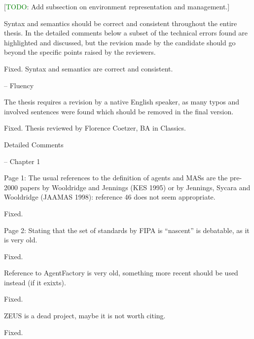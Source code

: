 \documentclass{article}
\newcommand{\todo}[1]{[\textcolor{green}{TODO}: #1]}
\newenvironment{them}{\noindent\begingroup\color{blue}}{\endgroup\par}
\begin{document}
\todo{Add subsection on environment representation and management.}

\begin{them}

Syntax and semantics should be correct and consistent throughout the entire
thesis. In the detailed comments below a subset of the technical errors found
are highlighted and discussed, but the revision made by the candidate should go
beyond the specific points raised by the reviewers.

\end{them}
Fixed. Syntax and semantics are correct and consistent.

\begin{them}

-- Fluency

The thesis requires a revision by a native English speaker, as many typos and
involved sentences were found which should be removed in the final version.

\end{them}
Fixed. Thesis reviewed by Florence Coetzer, BA in Classics.

\begin{them}

Detailed Comments

-- Chapter 1

Page 1:
The usual references to the definition of agents and MASs are the pre-2000
papers by Wooldridge and Jennings (KES 1995) or by Jennings, Sycara and
Wooldridge (JAAMAS 1998): reference 46 does not seem appropriate.

\end{them}
Fixed.

\begin{them}

Page 2:
Stating that the set of standards by FIPA is “nascent” is debatable, as it is
very old.

\end{them}
Fixed.

\begin{them}

Reference to AgentFactory is very old, something more recent should be used
instead (if it exixts).

\end{them}
Fixed.

\begin{them}

ZEUS is a dead project, maybe it is not worth citing.
\end{them}
Fixed.
\end{document}
